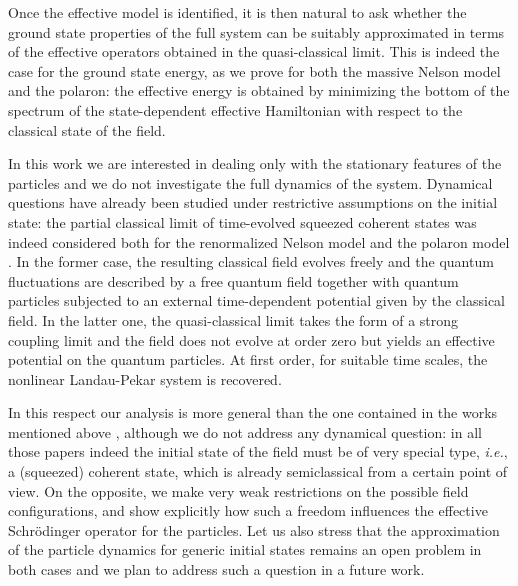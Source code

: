 \documentclass[11pt,a4paper,reqno]{amsart}
\theoremstyle{definition}
\numberwithin{equation}{section}
\begin{document}
Once the effective model is identified, it is then natural to ask whether the ground state properties of the
full system can be suitably approximated in terms of the effective operators obtained in the quasi-classical
limit. This is indeed the case for the ground state energy, as we prove for both the massive Nelson model and
the polaron: the effective energy is obtained by minimizing the bottom of the spectrum of the state-dependent
effective Hamiltonian with respect to the classical state of the field.

In this work we are interested in dealing only with the stationary features of the particles and we do not investigate
the full dynamics of the system. Dynamical questions have already been studied under restrictive assumptions
on the initial state: the partial classical limit of time-evolved squeezed coherent states was indeed
considered both for the renormalized Nelson model \cite{MR2205462} and the polaron model
\cite{Frank:2014aa,Frank:2015aa,Griesemer:2016aa}. In the former case, the resulting classical field evolves
freely and the quantum fluctuations are described by a free quantum field together with quantum particles
subjected to an external time-dependent potential given by the classical field. In the latter one, the
quasi-classical limit takes the form of a strong coupling limit and the field does not evolve at order zero
but yields an effective potential on the quantum particles. At first order, for suitable time scales, the
nonlinear Landau-Pekar system is recovered.

In this respect our analysis is more general than the one contained in the works mentioned above
\cite{MR2205462,Frank:2014aa,Frank:2015aa,Griesemer:2016aa}, although we do not address any dynamical
question: in all those papers indeed the initial state of the field must be of very special type, {\it i.e.},
a (squeezed) coherent state, which is already semiclassical from a certain point of view. On the opposite, we
make very weak restrictions on the possible field configurations, and show explicitly how such a freedom
influences the effective Schr\"{o}dinger operator for the particles. Let us also stress that the approximation
of the particle dynamics for generic initial states remains an open problem in both cases and we plan to
address such a question in a future work.
\end{document}
